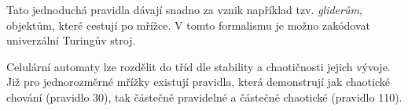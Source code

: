 Tato jednoduchá pravidla dávají snadno za vznik například tzv. {\em
gliderům}, objektům, které cestují po mřížce.
V tomto formalismu je možno zakódovat univerzální Turingův stroj.

Celulární automaty lze rozdělit do tříd dle stability a
chaotičnosti jejich vývoje. Již pro jednorozměrné
mřížky existují pravidla, která demonstrují jak chaotické chování
(pravidlo 30), tak částečně pravidelné a částečně chaotické (pravidlo
110).

